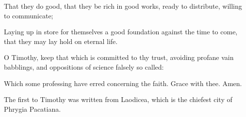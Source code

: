 {That they do
good, that they be
rich
in
good
works, ready to
distribute, willing to
communicate;

Laying up in
store for
themselves a
good
foundation
against the time to
come,
that they may lay hold
on
eternal
life.

O
Timothy,
keep that which is committed to thy
trust,
avoiding
profane
{} vain
babblings,
and
oppositions of
science falsely so
called:

Which
some
professing have
erred
concerning the
faith.
Grace
{}
with
thee.
Amen.


\par }{\SH The first to Timothy was written from Laodicea, which is the chiefest city of Phrygia Pacatiana.
\par }
